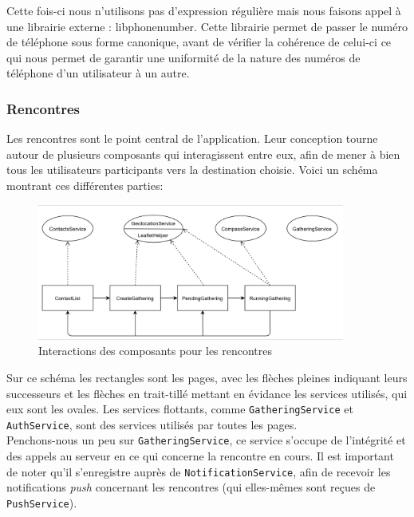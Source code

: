 \documentclass[french]{article}
\begin{document}
	Cette fois-ci nous n'utilisons pas d'expression régulière mais nous faisons appel à une librairie externe : libphonenumber.
	Cette librairie permet de passer le numéro de téléphone sous forme canonique, avant de vérifier la cohérence de celui-ci ce qui nous permet de garantir une uniformité de la nature des numéros de téléphone d'un utilisateur à un autre.
	
	 
	
	\subsubsection{Rencontres}
	
	Les rencontres sont le point central de l'application. Leur conception tourne autour de plusieurs composants qui interagissent entre eux, afin de mener à bien tous les utilisateurs participants vers la destination choisie. Voici un schéma montrant ces différentes parties:
	\begin{figure}[H]
		\centering
		\includegraphics[width=0.9\textwidth]{../schema/gathering-page-flow}
		\caption{Interactions des composants pour les rencontres}
	\end{figure}

	Sur ce schéma les rectangles sont les pages, avec les flèches pleines indiquant leurs successeurs et les flèches en trait-tillé mettant en évidance les services utilisés, qui eux sont les ovales. Les services flottants, comme \texttt{GatheringService} et \texttt{AuthService}, sont des services utilisés par toutes les pages.\\
	
	Penchons-nous un peu sur \texttt{GatheringService}, ce service s'occupe de l'intégrité et des appels au serveur en ce qui concerne la rencontre en cours. Il est important de noter qu'il s'enregistre auprès de \texttt{NotificationService}, afin de recevoir les notifications \textit{push} concernant les rencontres (qui elles-mêmes sont reçues de \texttt{PushService}).\\
	
\end{document}
